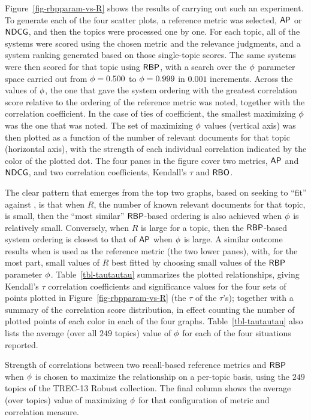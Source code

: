 Figure~\ref{fig-rbpparam-vs-R} shows the results of carrying out such
an experiment.
To generate each of the four scatter plots, a reference metric was
selected, ${\mbox{\sf{AP}}}$ or ${\mbox{\sf{NDCG}}}$, and then the topics were processed one by
one.
For each topic, all of the systems were scored using the chosen
metric and the relevance judgments, and a system ranking generated
based on those single-topic scores.
The same systems were then scored for that topic using ${\mbox{\sf{RBP}}}$, with a
search over the $\mbox{$\phi$}$ parameter space carried out from
$\mbox{$\phi$}=0.500$ to $\mbox{$\phi$}=0.999$ in $0.001$ increments.
Across the values of $\mbox{$\phi$}$, the one that gave the system ordering
with the greatest correlation score relative to the ordering of the
reference metric was noted, together with the correlation
coefficient.
In the case of ties of coefficient, the smallest maximizing $\mbox{$\phi$}$
was the one that was noted.
The set of maximizing $\mbox{$\phi$}$ values (vertical axis) was then plotted
as a function of the number of relevant documents for that topic
(horizontal axis), with the strength of each individual correlation
indicated by the color of the plotted dot.
The four panes in the figure cover two metrics, ${\mbox{\sf{AP}}}$ and ${\mbox{\sf{NDCG}}}$,
and two correlation coefficients, Kendall's $\tau$ and ${\mbox{\sf{RBO}}}$.

The clear pattern that emerges from the top two graphs, based on
seeking to ``fit'' against {\ap}, is that when $R$, the number of
known relevant documents for that topic, is small, then the ``most
similar'' ${\mbox{\sf{RBP}}}$-based ordering is also achieved when $\mbox{$\phi$}$ is
relatively small.
Conversely, when $R$ is large for a topic, then the ${\mbox{\sf{RBP}}}$-based
system ordering is closest to that of ${\mbox{\sf{AP}}}$ when $\mbox{$\phi$}$ is large.
A similar outcome results when {\ndcg} is used as the reference
metric (the two lower panes), with, for the most part, small values
of $R$ best fitted by choosing small values of the ${\mbox{\sf{RBP}}}$ parameter
$\mbox{$\phi$}$.
Table~\ref{tbl-tautautau} summarizes the plotted relationships,
giving Kendall's $\tau$ correlation coefficients and significance
values for the four sets of points plotted in
Figure~\ref{fig-rbpparam-vs-R} (the $\tau$ of the $\tau$'s); together
with a summary of the correlation score distribution, in effect
counting the number of plotted points of each color in each of the
four graphs.
Table~\ref{tbl-tautautau} also lists the average (over all $249$
topics) value of $\mbox{$\phi$}$ for each of the four situations reported.

\begin{table}
\centering

\caption{Strength of correlations between two recall-based reference
metrics and ${\mbox{\sf{RBP}}}$ when $\mbox{$\phi$}$ is chosen to maximize the
relationship on a per-topic basis, using the $249$ topics of the
TREC-13 Robust collection.
The final column shows the average (over topics) value of maximizing
$\mbox{$\phi$}$ for that configuration of metric and correlation measure.
\label{tbl-tautautau}}
\end{table}

